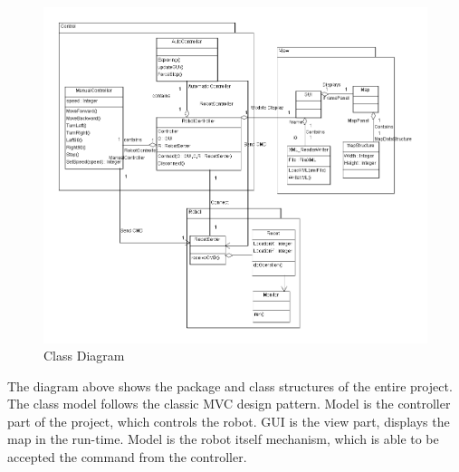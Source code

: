 \documentclass[11pt, a4paper]{report}
\begin{document}
\begin{figure}[h]
  \centering
    \includegraphics[width=16cm]{SEP_13_Class_Diagram.png}
  \caption{Class Diagram}
\end{figure}
The diagram above shows the package and class structures of the entire project. The class model follows the classic MVC design pattern. Model is the controller part of the project, which controls the robot. GUI is the view part, displays the map in the run-time. Model is the robot itself mechanism, which is able to be accepted the command from the controller.
\newpage
\end{document}
